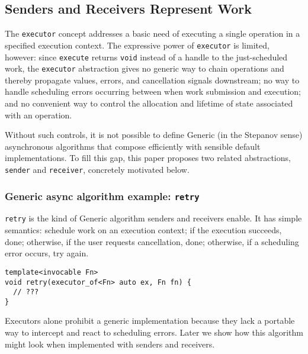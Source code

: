 \documentclass[a4paper,12pt,notitlepage,twoside,openright]{article}
\begin{document}
\hypertarget{senders-and-receivers-represent-work}{%
\subsection{Senders and Receivers Represent
Work}\label{senders-and-receivers-represent-work}}

The \texttt{executor} concept addresses a basic need of
executing a single operation in a specified execution context. The
expressive power of \texttt{executor} is limited, however:
since \texttt{execute} returns \texttt{void}
instead of a handle to the just-scheduled work, the
\texttt{executor} abstraction gives no generic way to chain
operations and thereby propagate values, errors, and cancellation
signals downstream; no way to handle scheduling errors occurring between
when work submission and execution; and no convenient way to control the
allocation and lifetime of state associated with an operation.

Without such controls, it is not possible to define Generic (in the
Stepanov sense) asynchronous algorithms that compose efficiently with
sensible default implementations. To fill this gap, this paper proposes
two related abstractions, \texttt{sender} and
\texttt{receiver}, concretely motivated below.

\hypertarget{generic-async-algorithm-example-retry}{%
\subsubsection{\texorpdfstring{Generic async algorithm example:
\texttt{retry}}{Generic async algorithm example: }}\label{generic-async-algorithm-example-retry}}

\texttt{retry} is the kind of Generic algorithm senders and
receivers enable. It has simple semantics: schedule work on an execution
context; if the execution succeeds, done; otherwise, if the user
requests cancellation, done; otherwise, if a scheduling error occurs,
try again.

\begin{verbatim}
template<invocable Fn>
void retry(executor_of<Fn> auto ex, Fn fn) {
  // ???
}
\end{verbatim}

Executors alone prohibit a generic implementation because they lack a
portable way to intercept and react to scheduling errors. Later we show
how this algorithm might look when implemented with senders and
receivers.
\end{document}
